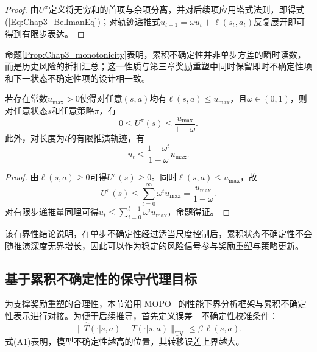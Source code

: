\begin{proof}
  由$U^{\pi}$定义将无穷和的首项与余项分离，并对后续项应用塔式法则，即得式(\ref{Eq:Chap3_BellmanEq})；对轨迹递推式$u_{t+1}=\omega u_t+\ell(s_t,a_t)$反复展开即可得到有限步表达。
\end{proof}

命题\ref{Prop:Chap3_monotonicity}表明，累积不确定性并非单步方差的瞬时读数，而是历史风险的折扣汇总；这一性质与第三章奖励重塑中同时保留即时不确定性项和下一状态不确定性项的设计相一致。

\begin{prop}[累积不确定性的有界性]\label{Prop:Chap3_upper_bound}
  若存在常数$u_{\max}>0$使得对任意$(s,a)$均有$\ell(s,a)\le u_{\max}$，且$\omega\in(0,1)$，则对任意状态$s$和任意策略$\pi$，有
  \begin{equation}
    0\le U^{\pi}(s)\le\frac{u_{\max}}{1-\omega}.
  \end{equation}
  此外，对长度为$t$的有限推演轨迹，有
  \begin{equation}
    u_t\le\frac{1-\omega^t}{1-\omega}u_{\max}.
  \end{equation}
\end{prop}

\begin{proof}
  由$\ell(s,a)\ge0$可得$U^{\pi}(s)\ge0$。同时$\ell(s,a)\le u_{\max}$，故
  \begin{equation}
    U^{\pi}(s)\le\sum_{t=0}^{\infty}\omega^tu_{\max}=\frac{u_{\max}}{1-\omega}.
  \end{equation}
  对有限步递推量同理可得$u_t\le\sum_{i=0}^{t-1}\omega^iu_{\max}$，命题得证。
\end{proof}

该有界性结论说明，在单步不确定性经过适当尺度控制后，累积状态不确定性不会随推演深度无界增长，因此可以作为稳定的风险信号参与奖励重塑与策略更新。

\subsection{基于累积不确定性的保守代理目标}\label{Sec3.3.2}

为支撑奖励重塑的合理性，本节沿用 MOPO~\cite{Yu2020MOPO} 的性能下界分析框架与累积不确定性表示进行对接。为便于后续推导，首先定义误差—不确定性校准条件：
\begin{equation}\tag{A1}\label{Eq:Chap3_error_bound_text}
  \|\hat{T}(\cdot|s,a)-T(\cdot|s,a)\|_{\mathrm{TV}}\le\beta\,\ell(s,a).
\end{equation}
式(A1)表明，模型不确定性越高的位置，其转移误差上界越大。


